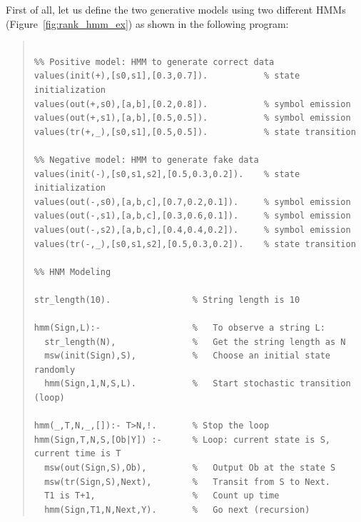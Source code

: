 \documentclass[a4paper]{report}
\begin{document}
First of all, let us define the two generative models using two different HMMs (Figure~\ref{fig:rank_hmm_ex}) as shown in the following program:

\begin{quote}
\begin{small}
\begin{verbatim}

%% Positive model: HMM to generate correct data 
values(init(+),[s0,s1],[0.3,0.7]).           % state initialization
values(out(+,s0),[a,b],[0.2,0.8]).           % symbol emission
values(out(+,s1),[a,b],[0.5,0.5]).           % symbol emission
values(tr(+,_),[s0,s1],[0.5,0.5]).           % state transition

%% Negative model: HMM to generate fake data 
values(init(-),[s0,s1,s2],[0.5,0.3,0.2]).    % state initialization
values(out(-,s0),[a,b,c],[0.7,0.2,0.1]).     % symbol emission
values(out(-,s1),[a,b,c],[0.3,0.6,0.1]).     % symbol emission
values(out(-,s2),[a,b,c],[0.4,0.4,0.2]).     % symbol emission
values(tr(-,_),[s0,s1,s2],[0.5,0.3,0.2]).    % state transition

%% HNM Modeling

str_length(10).                % String length is 10

hmm(Sign,L):-                  %   To observe a string L:
  str_length(N),               %   Get the string length as N
  msw(init(Sign),S),           %   Choose an initial state randomly
  hmm(Sign,1,N,S,L).           %   Start stochastic transition (loop)

hmm(_,T,N,_,[]):- T>N,!.       % Stop the loop
hmm(Sign,T,N,S,[Ob|Y]) :-      % Loop: current state is S, current time is T
  msw(out(Sign,S),Ob),         %   Output Ob at the state S
  msw(tr(Sign,S),Next),        %   Transit from S to Next.
  T1 is T+1,                   %   Count up time
  hmm(Sign,T1,N,Next,Y).       %   Go next (recursion)
\end{verbatim}
\end{small}
\end{quote}
\end{document}

